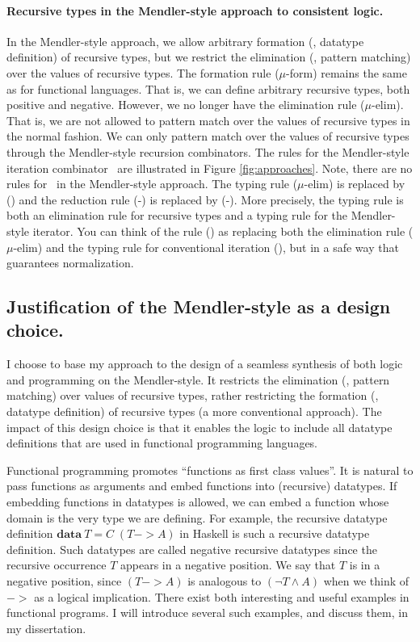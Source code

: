 \paragraph{Recursive types in the Mendler-style approach to consistent logic.}
In the Mendler-style approach, we allow arbitrary formation
(\ie, datatype definition) of recursive types, but we restrict
the elimination (\ie, pattern matching) over the values of recursive types. 
The formation rule {\small($\mu$-form)} remains the same as
for functional languages. That is, we can define arbitrary recursive types,
both positive and negative. However, we no longer have the elimination
rule {\small($\mu$-elim)}. That is, we are not allowed to pattern match over
the values of recursive types in the normal fashion. We can only pattern match
over the values of recursive types through the Mendler-style recursion
combinators. The rules for the Mendler-style iteration combinator \MIt\
are illustrated in Figure \ref{fig:approaches}.
Note, there are no rules for \unIn\ in the Mendler-style approach.
The typing rule {\small($\mu$-elim)} is replaced by {\small(\MIt)} and
the reduction rule {\small(\unIn-\In)} is replaced by {\small(\MIt-\In)}.
More precisely, the typing rule {\small \MIt} is both an elimination rule
for recursive types and a typing rule for the Mendler-style iterator.
You can think of the rule {\small(\MIt)} as replacing both the elimination rule
{\small($\mu$-elim)} and the typing rule for conventional iteration
{\small(\It)}, but in a safe way that guarantees normalization.

\subsection{Justification of the Mendler-style as a design choice.}
I choose to base my approach to the design of a seamless synthesis of both
logic and programming on the Mendler-style. It restricts the elimination (\ie,
pattern matching) over values of recursive types, rather restricting the
formation (\ie, datatype definition) of recursive types (a more conventional
approach). The impact of this design choice is that it enables the logic to
include all datatype definitions that are used in functional programming
languages.

Functional programming promotes ``functions as first class values''.
It is natural to pass functions as arguments and embed functions into
(recursive) datatypes. If embedding functions in datatypes is allowed,
we can embed a function whose domain is the very type we are defining.
For example, the recursive datatype definition
$\mathbf{data}~T = C\;(T -> \textit{A})$ in Haskell is such a recursive
datatype definition. Such datatypes are called negative recursive datatypes
since the recursive occurrence $T$ appears in a negative position.
We say that $T$ is in a negative position, since $(T -> A)$ is analogous to
$(\neg T \land A)$ when we think of $->$ as a logical implication. There exist
both interesting and useful examples in functional programs. I will
introduce several such examples, and discuss them, in my dissertation.

